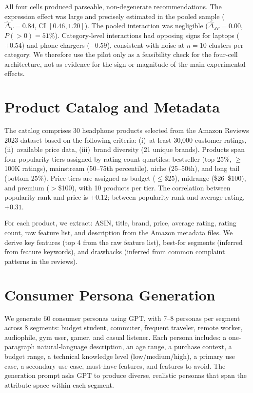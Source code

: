 \documentclass[11pt]{article}
\begin{document}
All four cells produced parseable, non-degenerate recommendations. The expression effect was large and precisely estimated in the pooled sample ($\hat{\Delta}_T = 0.84$, CI $[0.46, 1.20]$). The pooled interaction was negligible ($\hat{\Delta}_{JT} = 0.00$, $P(>0) = 51\%$). Category-level interactions had opposing signs for laptops ($+0.54$) and phone chargers ($-0.59$), consistent with noise at $n = 10$ clusters per category. We therefore use the pilot only as a feasibility check for the four-cell architecture, not as evidence for the sign or magnitude of the main experimental effects.

\section{Product Catalog and Metadata}\label{section:catalog}

The catalog comprises 30 headphone products selected from the Amazon Reviews 2023 dataset based on the following criteria: (i)~at least 30{,}000 customer ratings, (ii)~available price data, (iii)~brand diversity (21 unique brands). Products span four popularity tiers assigned by rating-count quartiles: bestseller (top 25\%, $\geq$100K ratings), mainstream (50--75th percentile), niche (25--50th), and long tail (bottom 25\%). Price tiers are assigned as budget ($\leq$\$25), midrange (\$26--\$100), and premium ($>$\$100), with 10 products per tier. The correlation between popularity rank and price is $+0.12$; between popularity rank and average rating, $+0.31$.

For each product, we extract: ASIN, title, brand, price, average rating, rating count, raw feature list, and description from the Amazon metadata files. We derive key features (top 4 from the raw feature list), best-for segments (inferred from feature keywords), and drawbacks (inferred from common complaint patterns in the reviews).

\section{Consumer Persona Generation}\label{section:personas}

We generate 60 consumer personas using GPT, with 7--8 personas per segment across 8 segments: budget student, commuter, frequent traveler, remote worker, audiophile, gym user, gamer, and casual listener. Each persona includes: a one-paragraph natural-language description, an age range, a purchase context, a budget range, a technical knowledge level (low/medium/high), a primary use case, a secondary use case, must-have features, and features to avoid. The generation prompt asks GPT to produce diverse, realistic personas that span the attribute space within each segment.
\end{document}
